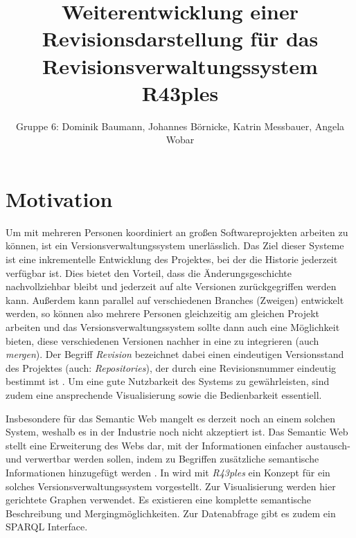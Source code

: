 \documentclass[nocolor]{tudbook}
\begin{document}
\author{Gruppe 6: Dominik Baumann, Johannes Börnicke, Katrin Messbauer, Angela Wobar}
\title{Weiterentwicklung einer Revisionsdarstellung für das Revisionsverwaltungssystem R43ples}
\maketitle

\tableofcontents

\chapter{Motivation}
Um mit mehreren Personen koordiniert an großen Softwareprojekten arbeiten zu können, ist ein Versionsverwaltungssystem unerlässlich. Das Ziel dieser Systeme ist eine inkrementelle Entwicklung des Projektes, bei der die Historie jederzeit verfügbar ist. Dies bietet den Vorteil, dass die Änderungsgeschichte nachvollziehbar bleibt und jederzeit auf alte Versionen zurückgegriffen werden kann. Außerdem kann parallel auf verschiedenen Branches (Zweigen) entwickelt werden, so können also mehrere Personen gleichzeitig am gleichen Projekt arbeiten und das Versionsverwaltungssystem sollte dann auch eine Möglichkeit bieten, diese verschiedenen Versionen nachher in eine zu integrieren (auch \textit{mergen}). Der Begriff \textit{Revision} bezeichnet dabei einen eindeutigen Versionsstand des Projektes (auch: \textit{Repositories}), der durch eine Revisionsnummer eindeutig bestimmt ist \cite{CAE}. Um eine gute Nutzbarkeit des Systems zu gewährleisten, sind zudem eine ansprechende Visualisierung sowie die Bedienbarkeit essentiell.

Insbesondere für das Semantic Web mangelt es derzeit noch an einem solchen System, weshalb es in der Industrie noch nicht akzeptiert ist. Das Semantic Web stellt eine Erweiterung des Webs dar, mit der Informationen einfacher austausch- und verwertbar werden sollen, indem zu Begriffen zusätzliche semantische Informationen hinzugefügt werden \cite{SemanticWeb}. In \cite{Graube} wird mit \textit{R43ples} ein Konzept für ein solches Versionsverwaltungssystem vorgestellt. Zur Visualisierung werden hier gerichtete Graphen verwendet. Es existieren eine komplette semantische Beschreibung und Mergingmöglichkeiten. Zur Datenabfrage gibt es zudem ein SPARQL Interface. 
\end{document}
